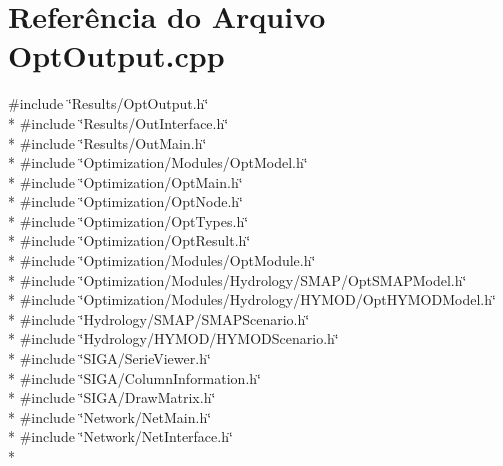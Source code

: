 \section{Referência do Arquivo Opt\+Output.\+cpp}
\label{_opt_output_8cpp}
{\ttfamily \#include \char`\"{}Results/\+Opt\+Output.\+h\char`\"{}}\\*
{\ttfamily \#include \char`\"{}Results/\+Out\+Interface.\+h\char`\"{}}\\*
{\ttfamily \#include \char`\"{}Results/\+Out\+Main.\+h\char`\"{}}\\*
{\ttfamily \#include \char`\"{}Optimization/\+Modules/\+Opt\+Model.\+h\char`\"{}}\\*
{\ttfamily \#include \char`\"{}Optimization/\+Opt\+Main.\+h\char`\"{}}\\*
{\ttfamily \#include \char`\"{}Optimization/\+Opt\+Node.\+h\char`\"{}}\\*
{\ttfamily \#include \char`\"{}Optimization/\+Opt\+Types.\+h\char`\"{}}\\*
{\ttfamily \#include \char`\"{}Optimization/\+Opt\+Result.\+h\char`\"{}}\\*
{\ttfamily \#include \char`\"{}Optimization/\+Modules/\+Opt\+Module.\+h\char`\"{}}\\*
{\ttfamily \#include \char`\"{}Optimization/\+Modules/\+Hydrology/\+S\+M\+A\+P/\+Opt\+S\+M\+A\+P\+Model.\+h\char`\"{}}\\*
{\ttfamily \#include \char`\"{}Optimization/\+Modules/\+Hydrology/\+H\+Y\+M\+O\+D/\+Opt\+H\+Y\+M\+O\+D\+Model.\+h\char`\"{}}\\*
{\ttfamily \#include \char`\"{}Hydrology/\+S\+M\+A\+P/\+S\+M\+A\+P\+Scenario.\+h\char`\"{}}\\*
{\ttfamily \#include \char`\"{}Hydrology/\+H\+Y\+M\+O\+D/\+H\+Y\+M\+O\+D\+Scenario.\+h\char`\"{}}\\*
{\ttfamily \#include \char`\"{}S\+I\+G\+A/\+Serie\+Viewer.\+h\char`\"{}}\\*
{\ttfamily \#include \char`\"{}S\+I\+G\+A/\+Column\+Information.\+h\char`\"{}}\\*
{\ttfamily \#include \char`\"{}S\+I\+G\+A/\+Draw\+Matrix.\+h\char`\"{}}\\*
{\ttfamily \#include \char`\"{}Network/\+Net\+Main.\+h\char`\"{}}\\*
{\ttfamily \#include \char`\"{}Network/\+Net\+Interface.\+h\char`\"{}}\\*
